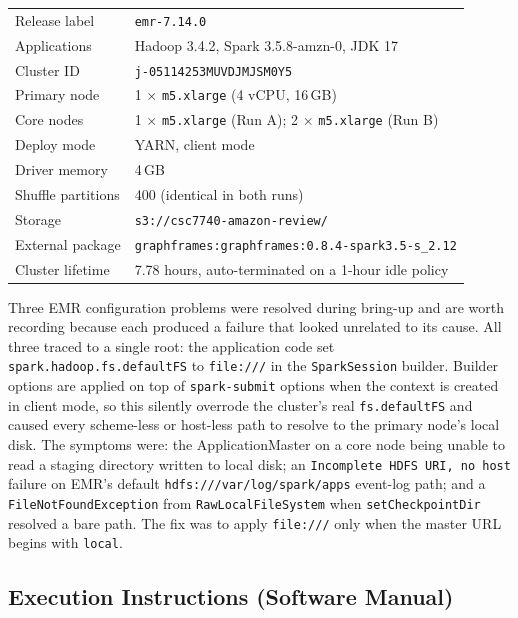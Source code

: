 \documentclass[12pt]{article}
\begin{document}
\begin{tabularx}{\textwidth}{@{}lX@{}}
  \toprule
  Release label            & \texttt{emr-7.14.0} \\
  Applications             & Hadoop 3.4.2, Spark 3.5.8-amzn-0, JDK 17 \\
  Cluster ID               & \texttt{j-05114253MUVDJMJSM0Y5} \\
  Primary node             & 1 $\times$ \texttt{m5.xlarge} (4 vCPU, 16\,GB) \\
  Core nodes               & 1 $\times$ \texttt{m5.xlarge} (Run A);
                             2 $\times$ \texttt{m5.xlarge} (Run B) \\
  Deploy mode              & YARN, client mode \\
  Driver memory            & 4\,GB \\
  Shuffle partitions       & 400 (identical in both runs) \\
  Storage                  & \texttt{s3://csc7740-amazon-review/} \\
  External package         & \texttt{graphframes:graphframes:0.8.4-spark3.5-s\_2.12} \\
  Cluster lifetime         & 7.78 hours, auto-terminated on a 1-hour idle policy \\
  \bottomrule
\end{tabularx}

Three EMR configuration problems were resolved during bring-up and are worth
recording because each produced a failure that looked unrelated to its cause.
All three traced to a single root: the application code set
\texttt{spark.hadoop.fs.defaultFS} to \texttt{file:///} in the
\texttt{SparkSession} builder. Builder options are applied on top of
\texttt{spark-submit} options when the context is created in client mode, so
this silently overrode the cluster's real \texttt{fs.defaultFS} and caused
every scheme-less or host-less path to resolve to the primary node's local
disk. The symptoms were: the ApplicationMaster on a core node being unable to
read a staging directory written to local disk; an
\texttt{Incomplete HDFS URI, no host} failure on EMR's default
\texttt{hdfs:///var/log/spark/apps} event-log path; and a
\texttt{FileNotFoundException} from \texttt{RawLocalFileSystem} when
\texttt{setCheckpointDir} resolved a bare path. The fix was to apply
\texttt{file:///} only when the master URL begins with \texttt{local}.

\subsection{Execution Instructions (Software Manual)}
\end{document}
